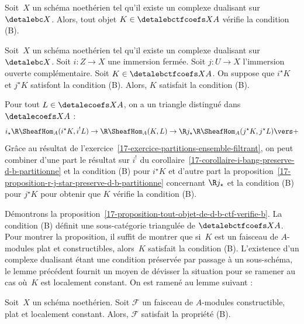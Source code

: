 \documentclass[10pt]{../fichiers-configuration-latex/smfart}
\begin{document}
\begin{proposition2}\label{17-proposition-tout-objet-de-d-b-ctf-verifie-b}
Soit $X$ un schéma noethérien tel qu'il existe un complexe dualisant sur
$\detalebc X$. Alors, tout objet $K\in\detalebctfcoefs X A$ vérifie la condition
(B).
\end{proposition2}

\begin{lemme2}
Soit $X$ un schéma noethérien tel qu'il existe un complexe dualisant sur
$\detalebc X$. Soit $i\colon Z\to X$ une immersion fermée. Soit $j\colon U\to
X$ l'immersion ouverte complémentaire. Soit $K\in\detalebctfcoefs X A$. On
suppose que $i^\star K$ et $j^\star K$ satisfont la condition (B). Alors, $K$
satisfait la condition (B).
\end{lemme2}

Pour tout $L\in\detalecoefs X A$, on a un
triangle distingué dans $\detalecoefs X A$ :
\[i_\star \R\SheafHom_A(i^\star K,i^!
L)\to\R\SheafHom_A(K,L)\to\R j_\star
\R\SheafHom_A(j^\star K,j^\star L)\vers +\]
Grâce au résultat de l'exercice~\ref{17-exercice-partitions-ensemble-filtrant},
on peut combiner d'une part le résultat sur $i^!$ du
corollaire~\ref{17-corollaire-i-bang-preserve-d-b-partitionne} et la condition
(B) pour $i^\star K$ et d'autre part la 
proposition~\ref{17-proposition-r-j-star-preserve-d-b-partitionne} concernant
$\R j_\star$ et la condition (B) pour $j^\star K$ pour obtenir que
$K$ vérifie la condition (B).

\bigskip

Démontrons la 
proposition~\ref{17-proposition-tout-objet-de-d-b-ctf-verifie-b}. La condition (B) définit une sous-catégorie
triangulée de $\detalebctfcoefs X A$. Pour montrer la proposition, il suffit de
montrer que si $K$ est un faisceau de $A$-modules plat et constructibles,
alors $K$ satisfait la condition (B).
L'existence d'un complexe dualisant étant une
condition préservée par passage à un sous-schéma, le lemme précédent
fournit un moyen de dévisser la situation pour se ramener au cas où $K$ est
localement constant. On est ramené au lemme suivant :

\begin{lemme2}
Soit $X$ un schéma noethérien. Soit $\mathscr F$ un faisceau de $A$-modules
constructible, plat et localement constant. Alors, $\mathscr F$ satisfait
la propriété (B).
\end{lemme2}
\end{document}
